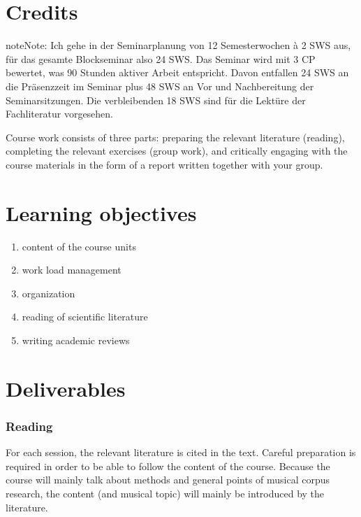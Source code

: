 \documentclass[letterpaper,10pt,english]{sphinxmanual}
\begin{document}
\section{Credits}
\label{\detokenize{1_orga:credits}}
\begin{sphinxadmonition}{note}{Note:}
Ich gehe in der Seminarplanung von 12 Semesterwochen à 2 SWS aus, für das gesamte Blockseminar also 24 SWS.
Das Seminar wird mit 3 CP bewertet, was 90 Stunden aktiver Arbeit entspricht.
Davon entfallen 24 SWS an die Präsenzzeit im Seminar plus 48 SWS an Vor\sphinxhyphen{} und Nachbereitung der Seminarsitzungen.
Die verbleibenden 18 SWS sind für die Lektüre der Fachliteratur vorgesehen.
\end{sphinxadmonition}

Course work consists of three parts: preparing the relevant literature (reading),
completing the relevant exercises (group work), and critically engaging with the course materials
in the form of a report written together with your group.


\section{Learning objectives}
\label{\detokenize{1_orga:learning-objectives}}\begin{enumerate}
%
\item {} 
content of the course units

\item {} 
work load management

\item {} 
organization

\item {} 
reading of scientific literature

\item {} 
writing academic reviews

\end{enumerate}


\section{Deliverables}
\label{\detokenize{1_orga:deliverables}}\subsubsection*{Reading}

For each session, the relevant literature is cited in the text.
Careful preparation is required in order to be able to follow the content of the course.
Because the course will mainly talk about methods and general points of musical corpus research,
the content (and musical topic) will mainly be introduced by the literature.
\end{document}
